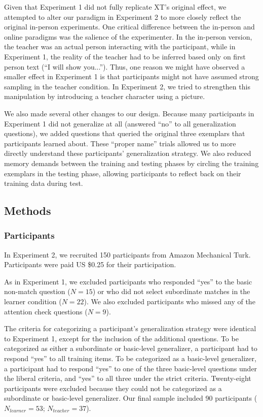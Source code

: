 \documentclass[man]{apa2}
\begin{document}
Given that Experiment 1 did not fully replicate XT's original effect, we attempted to alter our paradigm in Experiment 2 to more closely reflect the original in-person experiments. One critical difference between the in-person and online paradigms was the salience of the experimenter. In the in-person version, the teacher was an actual person interacting with the participant, while in Experiment 1, the reality of the teacher had to be inferred based only on first person text (``I will show you...''). Thus, one reason we might have observed a smaller effect in Experiment 1 is that participants might not have assumed strong sampling in the teacher condition. In Experiment 2, we tried to strengthen this manipulation by introducing a teacher character using a picture.

We also made several other changes to our design. Because many participants in Experiment 1 did not generalize at all (answered ``no'' to all generalization questions), we added questions that queried the original three exemplars that participants learned about. These ``proper name'' trials allowed us to more directly understand these participants' generalization strategy. We also reduced memory demands between the training and testing phases by circling the training exemplars in the testing phase, allowing participants to reflect back on their training data during test.

\subsection{Methods}

\subsubsection{Participants} In Experiment 2, we recruited 150 participants from Amazon Mechanical Turk. Participants were paid US \$0.25 for their participation.

As in Experiment 1, we excluded participants who responded ``yes'' to the basic non-match question ($N=15$) or who did not select subordinate matches in the learner condition ($N = 22$). We also excluded participants who missed any of the attention check questions ($N = 9$).

The criteria for categorizing a participant's generalization strategy were identical to Experiment 1, except for the inclusion of the additional questions. To be categorized as either a subordinate or basic-level generalizer, a participant had to respond ``yes'' to all training items. To be categorized as a basic-level generalizer, a participant had to respond ``yes'' to one of the three basic-level questions under the liberal criteria, and ``yes'' to all three under the strict criteria. Twenty-eight participants were excluded because they could not be categorized as a subordinate or basic-level generalizer.  Our final sample included 90 participants ($N_{learner} = 53$; $N_{teacher} = 37$).
\end{document}
